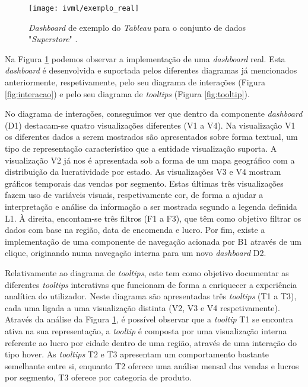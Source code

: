 \begin{figure}[htbp]
  \texttt{[image: ivml/exemplo\_real]}
  \centering
  \caption{\textit{Dashboard} de exemplo do \textit{Tableau} para o conjunto de dados "\textit{Superstore}" \cite{Ferreira2023IVML}.}
  \label{fig:exemplo}
\end{figure}

Na Figura \ref{fig:exemplo} podemos observar a implementação de uma \textit{dashboard} real. Esta \textit{dashboard} é desenvolvida e suportada pelos diferentes diagramas já mencionados anteriormente, respetivamente, pelo seu diagrama de interações (Figura \ref{fig:interacao}) e pelo seu diagrama de \textit{tooltips} (Figura \ref{fig:tooltip}). 

No diagrama de interações, conseguimos ver que dentro da componente \textit{dashboard} (D1) destacam-se quatro visualizações diferentes (V1 a V4). Na visualização V1 os diferentes dados a serem mostrados são apresentados sobre forma textual, um tipo de representação característico que a entidade visualização suporta. A visualização V2 já nos é apresentada sob a forma de um mapa geográfico com a distribuição da lucratividade por estado. As visualizações V3 e V4 mostram gráficos temporais das vendas por segmento. Estas últimas três visualizações fazem uso de variáveis visuais, respetivamente cor, de forma a ajudar a interpretação e análise da informação a ser mostrada segundo a legenda definida L1. À direita, encontam-se três filtros (F1 a F3), que têm como objetivo filtrar os dados com base na região, data de encomenda e lucro. Por fim, existe a implementação de uma componente de navegação acionada por B1 através de um clique, originando numa navegação interna para um novo \textit{dashboard} D2. 

Relativamente ao diagrama de \textit{tooltips}, este tem como objetivo documentar as diferentes \textit{tooltips} interativas que funcionam de forma a enriquecer a experiência analítica do utilizador. Neste diagrama são apresentadas três \textit{tooltips} (T1 a T3), cada uma ligada a uma visualização distinta (V2, V3 e V4 respetivamente). Através da análise da Figura \ref{fig:exemplo}, é possível observar que a \textit{tooltip} T1 se encontra ativa na sua representação, a \textit{tooltip} é composta por uma visualização interna referente ao lucro por cidade dentro de uma região, através de uma interação do tipo hover. As \textit{tooltips} T2 e T3 apresentam um comportamento bastante semelhante entre si, enquanto T2 oferece uma análise mensal das vendas e lucros por segmento, T3 oferece por categoria de produto. 

